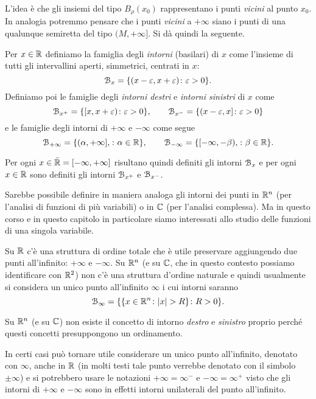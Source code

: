 L'idea è che gli insiemi del tipo
$B_\rho(x_0)$ 
rappresentano i punti \emph{vicini} al punto $x_0$. 
In analogia potremmo pensare che i punti \emph{vicini} 
a $+\infty$ siano i punti di una qualunque semiretta 
del tipo $(M,+\infty]$.
Si dà quindi la seguente.


\begin{definition}[intorno]
Per $x\in {\mathbb R}$ definiamo la famiglia degli \emph{intorni}%
%
 (basilari) di $x$
come l'insieme di tutti gli intervallini aperti, simmetrici, centrati in $x$:
\[
  \mathcal B_x = {\left\{  (x-\varepsilon, x+\varepsilon) \colon \varepsilon>0 \right\}}.
\]
Definiamo poi le famiglie 
degli \emph{intorni destri} e \emph{intorni sinistri}
%
di $x$ come
\[
  \mathcal B_{x^+} = {\left\{  [x, x+\varepsilon) \colon \varepsilon>0 \right\}},
  \qquad
  \mathcal B_{x^-} = {\left\{  (x-\varepsilon , x] \colon \varepsilon>0 \right\}}
\]
e le famiglie degli intorni di $+\infty$ e $-\infty$ come segue
\[
  \mathcal B_{+\infty} = {\left\{  (\alpha,+\infty], \colon \alpha \in {\mathbb R}  \right\}},\qquad
  \mathcal B_{-\infty} = {\left\{  [-\infty, -\beta), \colon \beta\in {\mathbb R} \right\}}.
\]

Per ogni $x\in \bar {{\mathbb R}} = [-\infty, +\infty]$
risultano quindi definiti gli intorni $\mathcal B_x$ e per
ogni $x\in {\mathbb R}$ sono definiti gli intorni $\mathcal B_{x^+}$ e $\mathcal B_{x^-}$.
\end{definition}

\begin{remark}
Sarebbe possibile definire in maniera analoga gli intorni dei punti in ${\mathbb R}^n$
(per l'analisi di funzioni di più variabili)
o in ${\mathbb C}$ (per l'analisi complessa).
Ma in questo corso e in questo capitolo in particolare siamo interessati 
allo studio delle funzioni di una singola variabile.

Su ${\mathbb R}$ c'è una struttura di ordine totale che è utile preservare aggiungendo
due punti all'infinito: $+\infty$ e $-\infty$.
Su ${\mathbb R}^n$ (e su ${\mathbb C}$, che in questo contesto possiamo identificare con ${\mathbb R}^2$)
non c'è una struttura d'ordine naturale e quindi
usualmente si considera un unico punto all'infinito $\infty$ i cui intorni
saranno
\[
  \mathcal B_\infty = {\left\{ {\left\{ x \in {\mathbb R}^n\colon {\left|x\right|}>R \right\}}\colon R>0 \right\}}.
\]

Su ${\mathbb R}^n$ (e su ${\mathbb C}$) non esiste il concetto di intorno \emph{destro}
e \emph{sinistro} proprio perché questi concetti presuppongono un ordinamento.

In certi casi può tornare utile considerare un unico punto all'infinito,
denotato con $\infty$, anche in ${\mathbb R}$ (in molti testi tale punto verrebbe
denotato con il simbolo $\pm\infty$)
e si potrebbero usare le notazioni $+\infty = \infty^-$ e $-\infty = \infty^
+$ visto che gli intorni di $+\infty$ e $-\infty$ sono in effetti intorni
unilaterali del punto all'infinito.
\end{remark}

